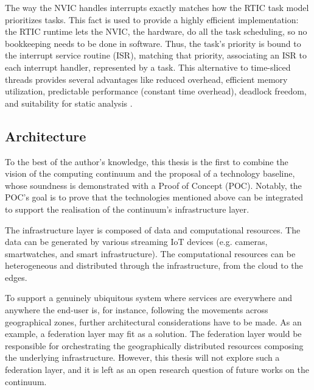 The way the NVIC handles interrupts \cite{interrupts-handling} exactly matches how the RTIC task model prioritizes tasks. This fact is used to provide a highly efficient implementation: the RTIC runtime lets the NVIC, the hardware, do all the task scheduling, so no bookkeeping needs to be done in software. Thus, the task's priority is bound to the interrupt service routine (ISR), matching that priority, associating an ISR to each interrupt handler, represented by a task. This alternative to time-sliced threads provides several advantages like reduced overhead, efficient memory utilization, predictable performance (constant time overhead), deadlock freedom, and suitability for static analysis \cite{rtfm}.

\subsection{Architecture}

To the best of the author's knowledge, this thesis is the first to combine the vision of the computing continuum and the proposal of a technology baseline, whose soundness is demonstrated with a Proof of Concept (POC). Notably, the POC's goal is to prove that the technologies mentioned above can be integrated to support the realisation of the continuum's infrastructure layer. 

The infrastructure layer is composed of data and computational resources. The data can be generated by various streaming IoT devices (e.g. cameras, smartwatches, and smart infrastructure). The computational resources can be heterogeneous and distributed through the infrastructure, from the cloud to the edges.

To support a genuinely ubiquitous system where services are everywhere and anywhere the end-user is, for instance, following the movements across geographical zones, further architectural considerations have to be made. As an example, a federation layer may fit as a solution. The federation layer would be responsible for orchestrating the geographically distributed resources composing the underlying infrastructure. However, this thesis will not explore such a federation layer, and it is left as an open research question of future works on the continuum.

